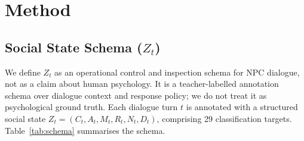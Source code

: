 \documentclass[11pt]{article}
\begin{document}
\section{Method}
\label{sec:method}

\subsection{Social State Schema ($Z_t$)}
\label{sec:schema}

We define $Z_t$ as an operational control and inspection schema for NPC dialogue, not as a claim about human psychology. It is a teacher-labelled annotation schema over dialogue context and response policy; we do not treat it as psychological ground truth. Each dialogue turn $t$ is annotated with a structured social state $Z_t = (C_t, A_t, M_t, R_t, N_t, D_t)$, comprising 29 classification targets.
Table~\ref{tab:schema} summarises the schema.

\begin{table}[t]
\centering
\caption{Structured social state schema $Z_t$. Each field is a classification target predicted by the 29-head model. Stance dimensions ($R_t$) each have a level (5-class ordinal) and a per-turn delta (5-class ordinal).}
\label{tab:schema}
\small
{}
\end{table}
\end{document}
